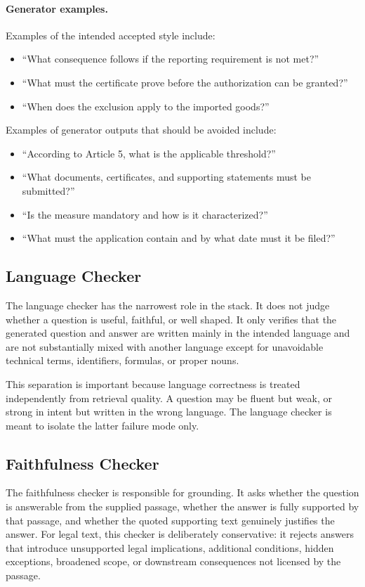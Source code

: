 \paragraph{Generator examples.}
Examples of the intended accepted style include:
\begin{itemize}
\item ``What consequence follows if the reporting requirement is not met?''
\item ``What must the certificate prove before the authorization can be granted?''
\item ``When does the exclusion apply to the imported goods?''
\end{itemize}

Examples of generator outputs that should be avoided include:
\begin{itemize}
\item ``According to Article 5, what is the applicable threshold?''
\item ``What documents, certificates, and supporting statements must be submitted?''
\item ``Is the measure mandatory and how is it characterized?''
\item ``What must the application contain and by what date must it be filed?''
\end{itemize}

\subsection{Language Checker}

The language checker has the narrowest role in the stack. It does not judge whether a question is useful, faithful, or well shaped. It only verifies that the generated question and answer are written mainly in the intended language and are not substantially mixed with another language except for unavoidable technical terms, identifiers, formulas, or proper nouns.

This separation is important because language correctness is treated independently from retrieval quality. A question may be fluent but weak, or strong in intent but written in the wrong language. The language checker is meant to isolate the latter failure mode only.

\subsection{Faithfulness Checker}

The faithfulness checker is responsible for grounding. It asks whether the question is answerable from the supplied passage, whether the answer is fully supported by that passage, and whether the quoted supporting text genuinely justifies the answer. For legal text, this checker is deliberately conservative: it rejects answers that introduce unsupported legal implications, additional conditions, hidden exceptions, broadened scope, or downstream consequences not licensed by the passage.

